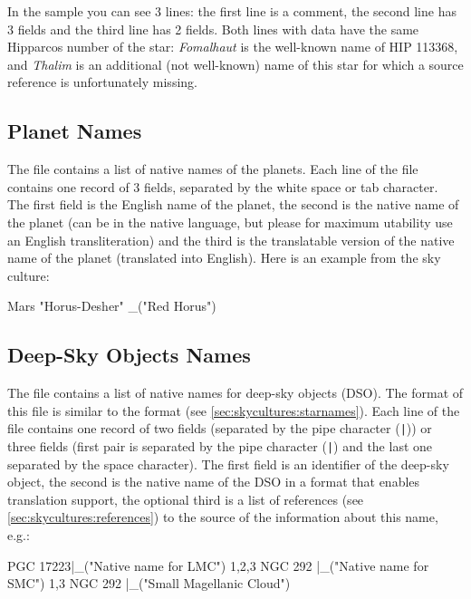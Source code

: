 In the sample you can see 3 lines: the first line is a comment, the 
second line has 3 fields and the third line has 2 fields. Both lines 
with data have the same Hipparcos number of the star: \textit{Fomalhaut} is 
the well-known name of HIP 113368, and \textit{Thalim} is an additional 
(not well-known) name of this star for which a source reference is unfortunately missing.

\subsection{Planet Names}
\label{sec:skycultures:planetnames}

The file  contains a list of native names of
the planets. Each line of the file contains one record of 3 fields,
separated by the white space or tab character. The first field is the
English name of the planet, the second is the native name of the
planet (can be in the native language, but please for maximum
utability use an English transliteration) and the third is the
translatable version of the native name of the planet (translated into
English). Here is an example from the  sky culture:

\begin{configfile}
Mars	"Horus-Desher"	_("Red Horus")
\end{configfile}

\subsection{Deep-Sky Objects Names}
\label{sec:skycultures:dsonames}

\noindent{}The file  contains a list of native names for
deep-sky objects (DSO). The format of this file is similar to the 
 format (see \ref{sec:skycultures:starnames}).
Each line of the file contains one record of two fields (separated 
by the pipe character (\texttt{|})) or three fields (first pair is 
separated by the pipe character (\texttt{|}) and the last one separated 
by the space character). The first field is an identifier of the
deep-sky object, the second is the native name of the DSO in a 
format that enables translation support, the optional third is a  
list of references (see \ref{sec:skycultures:references}) to the source 
of the information about this name, e.g.:
\begin{configfile}
PGC 17223|_("Native name for LMC") 1,2,3
NGC 292  |_("Native name for SMC") 1,3
NGC 292  |_("Small Magellanic Cloud")
\end{configfile}

